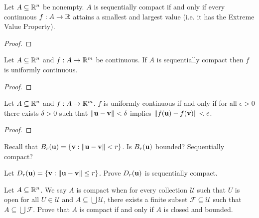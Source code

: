 \documentclass[letterpaper, twoside, 12pt]{book}
\begin{document}
\begin{theorem}[11.24]
  Let \(A\subseteq\mathbb R^n\) be nonempty.
  \(A\) is sequentially compact if and only if
  every continuous \(f:A\to\mathbb R\) attains a smallest and largest value
  (i.e. it has the Extreme Value Property).
\end{theorem}
\begin{proof}

\end{proof}

\begin{theorem}[11.25, Exercise 5]
  Let \(A\subseteq\mathbb R^n\) and \(f:A\to\mathbb R^m\) be continuous.
  If \(A\) is sequentially compact then \(f\) is uniformly continuous.
\end{theorem}
\begin{proof}

\end{proof}

\begin{theorem}[11.27, Exercise 11]
  Let \(A\subseteq\mathbb R^n\) and \(f:A\to\mathbb R^m\).
  \(f\) is uniformly continuous if and only if for all \(\epsilon>0\)
  there exists \(\delta>0\) such that \(\|\mathbf u-\mathbf v\|<\delta\)
  implies \(\|f(\mathbf u)-f(\mathbf v)\|<\epsilon\).
\end{theorem}
\begin{proof}

\end{proof}

\begin{exercise}[2,3]
  Recall that \(B_r(\mathbf u)=\{\mathbf v:\|\mathbf u-\mathbf v\|<r\}\).
  Is \(B_r(\mathbf u)\) bounded? Sequentially compact?
\end{exercise}
\begin{solution}

\end{solution}

\begin{exercise}[4]
  Let \(D_r(\mathbf u)=\{\mathbf v:\|\mathbf u-\mathbf v\|\leq r\}\).
  Prove \(D_r(\mathbf u)\) is sequentially compact.
\end{exercise}
\begin{solution}

\end{solution}

\begin{exercise}
  Let \(A\subseteq\mathbb R^n\). We say \(A\) is compact when for every
  collection \(\mathcal U\) such that \(U\) is open
  for all \(U\in\mathcal U\) and \(A\subseteq\bigcup\mathcal U\), there exists
  a finite subset \(\mathcal F\subseteq\mathcal U\) such that
  \(A\subseteq\bigcup\mathcal F\). Prove that \(A\) is compact if and only if
  \(A\) is closed and bounded.
\end{exercise}
\begin{solution}

\end{solution}
\end{document}
